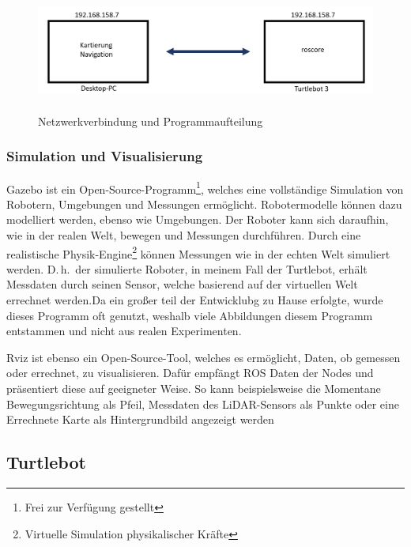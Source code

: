 {{{		\begin{figure}[H]
			\centering
			\includegraphics[height=4cm]{Bilder/network_turtlebot.png}
			\caption{Netzwerkverbindung und Programmaufteilung} 
			\label{pic:networkturtlebot}
		\end{figure}
		}
		
		\subsubsection{Simulation und Visualisierung}
		{
			Gazebo ist ein Open-Source-Programm\footnote{Frei zur Verfügung gestellt}, welches eine vollständige Simulation von Robotern, Umgebungen und Messungen ermöglicht. Robotermodelle können dazu modelliert werden, ebenso wie Umgebungen. Der Roboter kann sich daraufhin, wie in der realen Welt, bewegen und Messungen durchführen. Durch eine realistische Physik-Engine\footnote{Virtuelle Simulation physikalischer Kräfte} können Messungen wie in der echten Welt simuliert werden. D.\,h.\ der simulierte Roboter, in meinem Fall der Turtlebot, erhält Messdaten durch seinen Sensor, welche basierend auf der virtuellen Welt errechnet werden.Da ein großer teil der Entwicklubg zu Hause erfolgte, wurde dieses Programm oft genutzt, weshalb viele Abbildungen diesem Programm entstammen und nicht aus realen Experimenten.
			
			Rviz ist ebenso ein Open-Source-Tool, welches es ermöglicht, Daten, ob gemessen oder errechnet, zu visualisieren. Dafür empfängt ROS Daten der Nodes und präsentiert diese auf geeigneter Weise. So kann beispielsweise die Momentane Bewegungsrichtung als Pfeil, Messdaten des LiDAR-Sensors als Punkte oder eine Errechnete Karte als Hintergrundbild angezeigt werden
			
			
		}
	}
	\subsection{Turtlebot}
	{
}}
